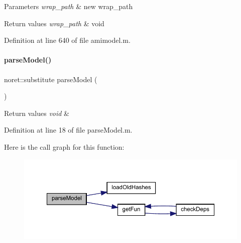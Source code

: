 \begin{DoxyParams}{Parameters}
{\em wrap\+\_\+path} & new wrap\+\_\+path\\
\hline
\end{DoxyParams}

\begin{DoxyRetVals}{Return values}
{\em wrap\+\_\+path} & void \\
\hline
\end{DoxyRetVals}


Definition at line 640 of file amimodel.\+m.

\mbox{\label{classamimodel_ae4172c2a8fac8b7c434f03274fcac6ac}} 
\paragraph{\texorpdfstring{parseModel()}{parseModel()}}
{\footnotesize\ttfamily noret\+::substitute parse\+Model (\begin{DoxyParamCaption}{ }\end{DoxyParamCaption})}


\begin{DoxyRetVals}{Return values}
{\em void} & \\
\hline
\end{DoxyRetVals}


Definition at line 18 of file parse\+Model.\+m.

Here is the call graph for this function\+:
\nopagebreak
\begin{figure}[H]
\begin{center}
\leavevmode
\includegraphics[width=350pt]{classamimodel_ae4172c2a8fac8b7c434f03274fcac6ac_cgraph}
\end{center}
\end{figure}
\mbox{\label{classamimodel_a73df9b3d523823e7a0105916471f13f5}} 
